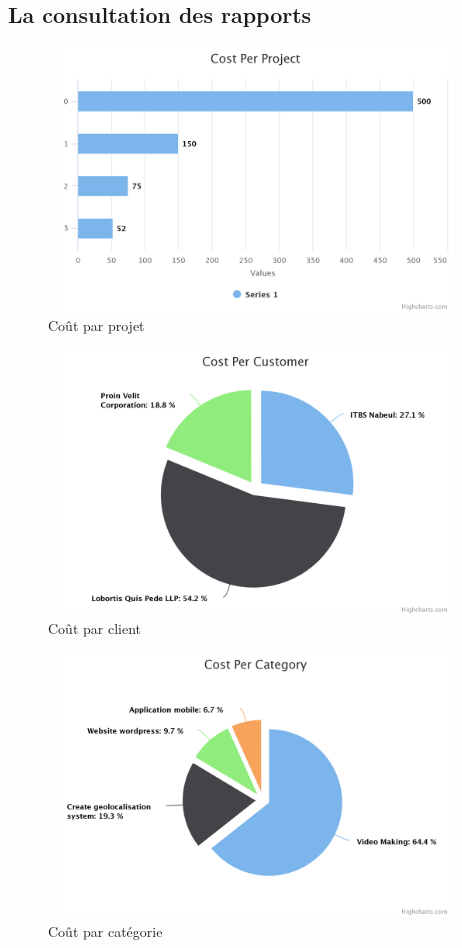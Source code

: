 \subsection{La consultation des rapports}


\FloatBarrier
\begin{figure}[H]
\center
\includegraphics[width=11cm,height=7cm]{./figures/pres/cost-per-project.png}
\caption{ Co\^{u}t par projet }
\end{figure}
\FloatBarrier


\FloatBarrier
\begin{figure}[H]
\center
\includegraphics[width=11cm,height=7cm]{./figures/pres/cost-per-customer.png}
\caption{ Co\^{u}t par client }
\end{figure}
\FloatBarrier

\FloatBarrier
\begin{figure}[H]
\center
\includegraphics[width=11cm,height=7cm]{./figures/pres/cost-per-category.png}
\caption{ Co\^{u}t par cat\'{e}gorie}
\end{figure}
\FloatBarrier

